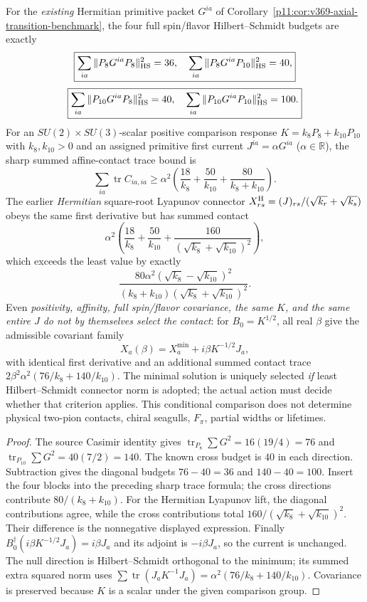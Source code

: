 \documentclass[12pt,a4paper]{article}
\begin{document}
\begin{corollary}
\label{p11:cor:v374-native-56-contact-budget-and-nonuniqueness}
For the \emph{existing} Hermitian primitive packet $G^{ia}$ of
Corollary~\ref{p11:cor:v369-axial-transition-benchmark}, the four
full spin/flavor Hilbert--Schmidt budgets are exactly
\[
 \boxed{\sum_{ia}\|P_8G^{ia}P_8\|_{\rm HS}^2=36,\quad
 \sum_{ia}\|P_8G^{ia}P_{10}\|_{\rm HS}^2=40,}
\]
\[
 \boxed{\sum_{ia}\|P_{10}G^{ia}P_8\|_{\rm HS}^2=40,\quad
 \sum_{ia}\|P_{10}G^{ia}P_{10}\|_{\rm HS}^2=100.}
\]
For an $SU(2)\times SU(3)$-scalar positive comparison response
$K=k_8P_8+k_{10}P_{10}$ with $k_8,k_{10}>0$ and an assigned
primitive first current $J^{ia}=\alpha G^{ia}$ ($\alpha\in\mathbb R$),
the sharp summed affine-contact trace bound is
\[
 \boxed{\sum_{ia}\operatorname{tr}C_{ia,ia}\ge
 \alpha^2\left(\frac{18}{k_8}+\frac{50}{k_{10}}
 +\frac{80}{k_8+k_{10}}\right).}
\]
The earlier \emph{Hermitian} square-root Lyapunov connector
$X_{rs}^{\rm H}=(J)_{rs}/(\sqrt{k_r}+\sqrt{k_s})$ obeys the
same first derivative but has summed contact
\[
 \boxed{\alpha^2\left(\frac{18}{k_8}+\frac{50}{k_{10}}
 +\frac{160}{(\sqrt{k_8}+\sqrt{k_{10}})^2}\right),}
\]
which exceeds the least value by exactly
\[
 \boxed{\frac{80\alpha^2(\sqrt{k_8}-\sqrt{k_{10}})^2}
 {(k_8+k_{10})(\sqrt{k_8}+\sqrt{k_{10}})^2}.}
\]
Even \emph{positivity, affinity, full spin/flavor covariance, the
same $K$, and the same entire $J$ do not by themselves select the
contact}: for $B_0=K^{1/2}$, all real $\beta$ give the admissible
covariant family
\[
 \boxed{X_a(\beta)=X_a^{\min}+i\beta K^{-1/2}J_a,}
\]
with identical first derivative and an additional summed contact trace
$2\beta^2\alpha^2(76/k_8+140/k_{10})$. The minimal solution is
uniquely selected \emph{if} least Hilbert--Schmidt connector norm is
adopted; the actual action must decide whether that criterion applies.
This conditional comparison does not determine physical two-pion
contacts, chiral seagulls, $F_\pi$, partial widths or lifetimes.
\end{corollary}
\begin{proof}
The source Casimir identity gives
$\operatorname{tr}_{P_8}\sum G^2=16(19/4)=76$ and
$\operatorname{tr}_{P_{10}}\sum G^2=40(7/2)=140$.
The known cross budget is $40$ in each direction. Subtraction gives
the diagonal budgets $76-40=36$ and $140-40=100$.
Insert the four blocks into the preceding sharp trace formula;
the cross directions contribute $80/(k_8+k_{10})$.
For the Hermitian Lyapunov lift, the diagonal contributions agree,
while the cross contributions total
$160/(\sqrt{k_8}+\sqrt{k_{10}})^2$. Their difference is the
nonnegative displayed expression. Finally
$B_0^\dagger(i\beta K^{-1/2}J_a)=i\beta J_a$ and its adjoint
is $-i\beta J_a$, so the current is unchanged. The null direction
is Hilbert--Schmidt orthogonal to the minimum; its summed extra
squared norm uses $\sum\operatorname{tr}(J_aK^{-1}J_a)
=\alpha^2(76/k_8+140/k_{10})$. Covariance is preserved because
$K$ is a scalar under the given comparison group.
\end{proof}
\end{document}
